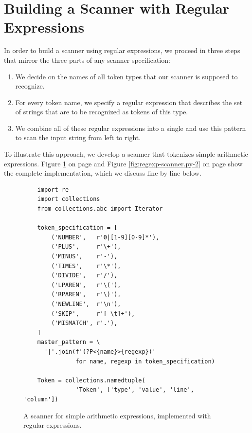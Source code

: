 \section{Building a Scanner with Regular Expressions \label{section:regexp-scanner}}
In order to build a scanner using regular expressions, we proceed in three steps that mirror the three parts of
any scanner specification:
\begin{enumerate}
\item We decide on the names of all token types that our scanner is supposed to recognize.
\item For every token name, we specify a regular expression that describes the set of strings that are to be
      recognized as tokens of this type.
\item We combine all of these regular expressions into a single  and
      use this pattern to scan the input string from left to right.
\end{enumerate}
To illustrate this approach, we develop a scanner that tokenizes simple arithmetic expressions.  Figure
\ref{fig:regexp-scanner.py-1} on page \pageref{fig:regexp-scanner.py-1} and Figure
\ref{fig:regexp-scanner.py-2} on page \pageref{fig:regexp-scanner.py-2} show the complete implementation, which we discuss line by line below.

\begin{figure}[!ht]
\centering
  \begin{verbatim}
    import re
    import collections
    from collections.abc import Iterator
    
    token_specification = [
        ('NUMBER',   r'0|[1-9][0-9]*'),
        ('PLUS',     r'\+'),
        ('MINUS',    r'-'),
        ('TIMES',    r'\*'),
        ('DIVIDE',   r'/'),
        ('LPAREN',   r'\('),
        ('RPAREN',   r'\)'),
        ('NEWLINE',  r'\n'),
        ('SKIP',     r'[ \t]+'),
        ('MISMATCH', r'.'),
    ]
    master_pattern = \
      '|'.join(f'(?P<{name}>{regexp})'
               for name, regexp in token_specification)
    
    Token = collections.namedtuple(
               'Token', ['type', 'value', 'line', 'column'])
\end{verbatim}
\vspace*{-0.3cm}
\caption{A scanner for simple arithmetic expressions, implemented with regular expressions.}
\label{fig:regexp-scanner.py-1}
\end{figure}

